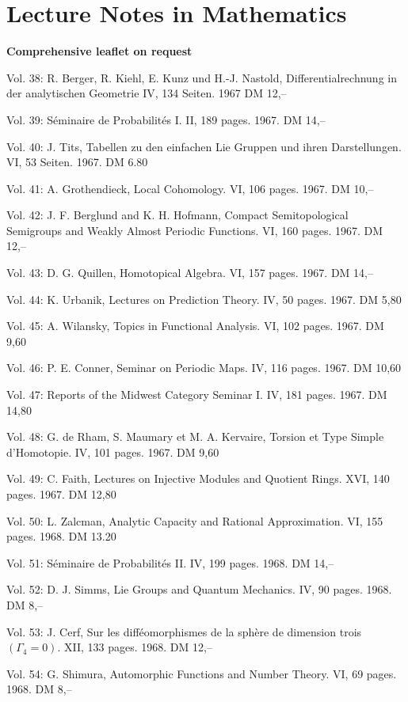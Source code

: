 \section*{Lecture Notes in Mathematics}
\textbf{Comprehensive leaflet on request}

Vol. 38: R. Berger, R. Kiehl, E. Kunz und H.-J. Nastold, Differentialrechnung in der analytischen Geometrie IV, 134 Seiten. 1967 DM 12,--

Vol. 39: Séminaire de Probabilités I. II, 189 pages. 1967. DM 14,--

Vol. 40: J. Tits, Tabellen zu den einfachen Lie Gruppen und ihren Darstellungen. VI, 53 Seiten. 1967. DM 6.80

Vol. 41: A. Grothendieck, Local Cohomology. VI, 106 pages. 1967. DM 10,--

Vol. 42: J. F. Berglund and K. H. Hofmann, Compact Semitopological Semigroups and Weakly Almost Periodic Functions. VI, 160 pages. 1967. DM 12,--

Vol. 43: D. G. Quillen, Homotopical Algebra. VI, 157 pages. 1967. DM 14,--

Vol. 44: K. Urbanik, Lectures on Prediction Theory. IV, 50 pages. 1967. DM 5,80

Vol. 45: A. Wilansky, Topics in Functional Analysis. VI, 102 pages. 1967. DM 9,60

Vol. 46: P. E. Conner, Seminar on Periodic Maps. IV, 116 pages. 1967. DM 10,60

Vol. 47: Reports of the Midwest Category Seminar I. IV, 181 pages. 1967. DM 14,80

Vol. 48: G. de Rham, S. Maumary et M. A. Kervaire, Torsion et Type Simple d'Homotopie. IV, 101 pages. 1967. DM 9,60

Vol. 49: C. Faith, Lectures on Injective Modules and Quotient Rings. XVI, 140 pages. 1967. DM 12,80

Vol. 50: L. Zalcman, Analytic Capacity and Rational Approximation. VI, 155 pages. 1968. DM 13.20

Vol. 51: Séminaire de Probabilités II. IV, 199 pages. 1968. DM 14,--

Vol. 52: D. J. Simms, Lie Groups and Quantum Mechanics. IV, 90 pages. 1968. DM 8,--

Vol. 53: J. Cerf, Sur les difféomorphismes de la sphère de dimension trois \((\Gamma_4=0)\). XII, 133 pages. 1968. DM 12,--

Vol. 54: G. Shimura, Automorphic Functions and Number Theory. VI, 69 pages. 1968. DM 8,--

